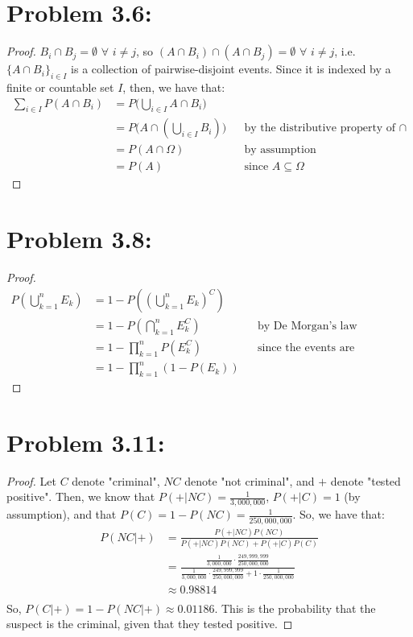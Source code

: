 \documentclass{article}
\begin{document}
\section*{Problem 3.6:}

\begin{proof}
$B_i \cap B_j = \emptyset$ $\forall$ $i \ne j$, so $(A \cap B_i) \cap (A \cap B_j) = \emptyset$ $\forall$ $i \ne j$, i.e. $\{A \cap B_i\}_{i \in I}$ is a collection of pairwise-disjoint events. Since it is indexed by a finite or countable set $I$, then, we have that:
\begin{align*}
\sum\limits_{i \in I} P(A \cap B_i) &= P\big(\bigcup\limits_{i \in I} A \cap B_i \big) \\
&= P\big(A \cap (\bigcup\limits_{i \in I} B_i) \big) &&\text{by the distributive property of $\cap$} \\
&= P(A \cap \Omega) &&\text{by assumption} \\
&= P(A) &&\text{since $A \subseteq \Omega$}
\end{align*}
\end{proof}

\section*{Problem 3.8:}

\begin{proof}
\begin{align*}
P(\bigcup\limits_{k = 1}^n E_k) &= 1 - P((\bigcup\limits_{k = 1}^n E_k)^C) \\
&= 1 - P(\bigcap\limits_{k = 1}^n E_k^C) &&\text{by De Morgan's law} \\
&= 1 - \prod\limits_{k = 1}^n P(E_k^C) &&\text{since the events are independent} \\
&= 1 - \prod\limits_{k = 1}^n (1 - P(E_k))
\end{align*}
\end{proof}

\section*{Problem 3.11:}
\begin{proof}
Let $C$ denote "criminal", $NC$ denote "not criminal", and $+$ denote "tested positive". Then, we know that $P(+ | NC) = \frac{1}{3,000,000}$, $P(+ | C) = 1$ (by assumption), and that $P(C) = 1 - P(NC) = \frac{1}{250,000,000}$. So, we have that:
\begin{align*}
P(NC | +) &= \frac{P(+ | NC)P(NC)}{P(+ | NC)P(NC) + P(+ | C)P(C)} \\
&= \frac{\frac{1}{3,000,000} \cdot \frac{249,999,999}{250,000,000}}{\frac{1}{3,000,000} \cdot \frac{249,999,999}{250,000,000} + 1 \cdot \frac{1}{250,000,000}} \\
&\approx 0.98814 \\
\end{align*}
So, $P(C | +) = 1 - P(NC | +) \approx 0.01186$. This is the probability that the suspect is the criminal, given that they tested positive.
\end{proof}
\end{document}
